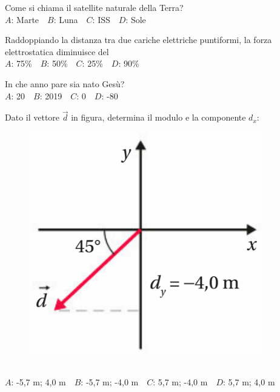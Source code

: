 \mcquestionfooter



\def\mcquestionnumber{4}


\mcquestionheader Come si chiama il satellite naturale della Terra?\\
{$A$}: Marte\ \ {$B$}: Luna\ \ {$C$}: ISS\ \ {$D$}: Sole\ \ 

\mcquestionfooter



\def\mcquestionnumber{5}


\mcquestionheader Raddoppiando la distanza tra due cariche elettriche puntiformi, la forza elettrostatica diminuisce del\\
{$A$}: 75\%\ \ {$B$}: 50\%\ \ {$C$}: 25\%\ \ {$D$}: 90\%\ \ 

\mcquestionfooter



\def\mcquestionnumber{6}


\mcquestionheader In che anno pare sia nato Gesù?\\
{$A$}: 20\ \ {$B$}: 2019\ \ {$C$}: 0\ \ {$D$}: -80\ \ 

\mcquestionfooter



\def\mcquestionnumber{7}


\mcquestionheader Dato il vettore $\vec{d}$ in figura, determina il modulo e la componente $d_x$: \begin{figure}[h!]   \begin{center}     \includegraphics[scale=0.35]{vettored.png}   \end{center} \end{figure}\\
{$A$}: -5,7 m; 4,0 m\ \ {$B$}: -5,7 m; -4,0 m\ \ {$C$}: 5,7 m; -4,0 m\ \ {$D$}: 5,7 m; 4,0 m\ \ 


